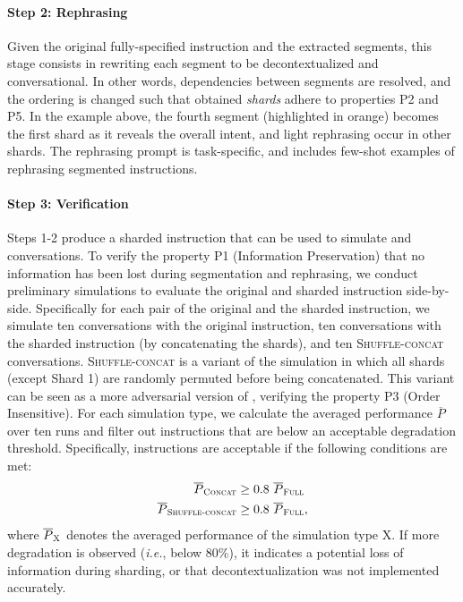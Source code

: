 \documentclass{article}
\begin{document}
\begin{appendices}
\paragraph{Step 2: Rephrasing} Given the original fully-specified instruction and the extracted segments, this stage consists in rewriting each segment to be decontextualized \cite{choi2021decontextualization} and conversational. In other words, dependencies between segments are resolved, and the ordering is changed such that obtained \textit{shards} adhere to properties P2 and P5. In the example above, the fourth segment (highlighted in orange) becomes the first shard as it reveals the overall intent, and light rephrasing occur in other shards. The rephrasing prompt is task-specific, and includes few-shot examples of rephrasing segmented instructions.

\paragraph{Step 3: Verification} Steps 1-2 produce a sharded instruction that can be used to simulate \shardedt and \concatt conversations. To verify the property P1 (Information Preservation) that no information has been lost during segmentation and rephrasing, we conduct preliminary simulations to evaluate the original and sharded instruction side-by-side. Specifically for each pair of the original and the sharded instruction, we simulate ten \fullt conversations with the original instruction, ten \concatt conversations with the sharded instruction (by concatenating the shards), and ten \textsc{Shuffle-concat} conversations. \textsc{Shuffle-concat} is a variant of the \concatt simulation in which all shards (except Shard 1) are randomly permuted before being concatenated. This variant can be seen as a more adversarial version of \concatt, verifying the property P3 (Order Insensitive). For each simulation type, we calculate the averaged performance $\overline{P}$ over ten runs and filter out instructions that are below an acceptable degradation threshold. Specifically, instructions are acceptable if the following conditions are met:
\begin{align*}
  \overline{P}_{\textsc{Concat}} &\geq 0.8~\overline{P}_{\textsc{Full}}\\
  \overline{P}_{\textsc{Shuffle-concat}} &\geq 0.8~\overline{P}_{\textsc{Full}},
\end{align*}
where $\overline{P}_{\textsc{X}}$ denotes the averaged performance of the simulation type \textsc{X}. If more degradation is observed (\textit{i.e.}, below 80\%), it indicates a potential loss of information during sharding, or that decontextualization was not implemented accurately.


\end{appendices}
\end{document}
